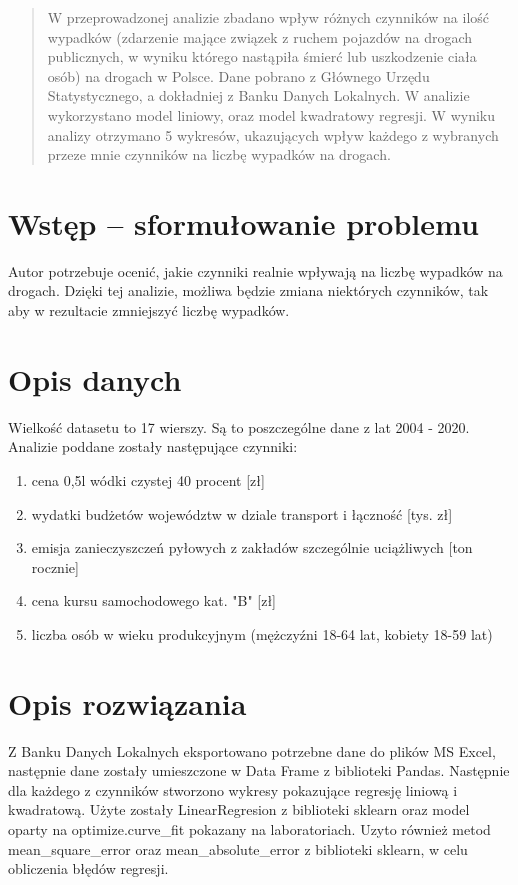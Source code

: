 \documentclass[10pt]{article}
\begin{document}


\begin{abstract}
W przeprowadzonej analizie zbadano wpływ różnych czynników na ilość wypadków (zdarzenie mające związek z ruchem pojazdów na drogach publicznych, w wyniku którego nastąpiła śmierć lub uszkodzenie ciała osób) na drogach w Polsce. Dane pobrano z Głównego Urzędu Statystycznego, a dokładniej z Banku Danych Lokalnych. W analizie wykorzystano model liniowy, oraz model kwadratowy regresji. W wyniku analizy otrzymano 5 wykresów, ukazujących wpływ każdego z wybranych przeze mnie czynników na liczbę wypadków na drogach. 

\end{abstract}

\section{Wstęp -- sformułowanie problemu}
\label{sec:wstep}
Autor potrzebuje ocenić, jakie czynniki realnie wpływają na liczbę wypadków na drogach. Dzięki tej analizie, możliwa będzie zmiana niektórych czynników, tak aby w rezultacie zmniejszyć liczbę wypadków.



\section{Opis danych}
Wielkość datasetu to 17 wierszy. Są to poszczególne dane z lat 2004 - 2020. Analizie poddane zostały następujące czynniki:
\begin{enumerate}
    \item cena 0,5l wódki czystej 40 procent [zł] 
    \item wydatki budżetów województw w dziale transport i łączność [tys. zł]
    \item emisja zanieczyszczeń pyłowych z zakładów szczególnie uciążliwych [ton rocznie]
    \item cena kursu samochodowego kat. "B" [zł]
    \item liczba osób w wieku produkcyjnym (mężczyźni 18-64 lat, kobiety 18-59 lat)
\end{enumerate}

\section{Opis rozwiązania}
Z Banku Danych Lokalnych eksportowano potrzebne dane do plików MS Excel, następnie dane zostały umieszczone w Data Frame z biblioteki Pandas. Następnie dla każdego z czynników stworzono wykresy pokazujące regresję liniową i kwadratową. Użyte zostały LinearRegresion z biblioteki sklearn oraz model oparty na optimize.curve\_fit pokazany na laboratoriach. Uzyto również metod mean\_square\_error oraz mean\_absolute\_error z biblioteki sklearn, w celu obliczenia błędów regresji.
\end{document}
